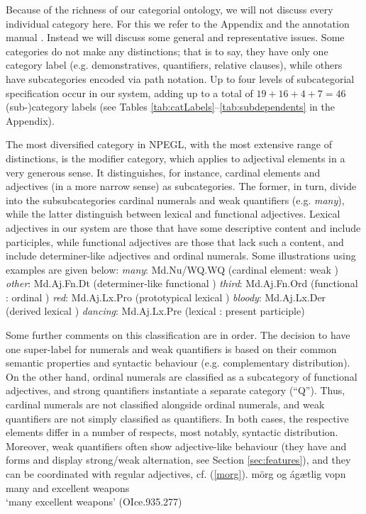 \documentclass[output=paper,colorlinks,citecolor=brown]{langscibook}
\begin{document}
Because of the richness of our categorial ontology, we will not discuss every individual category here. For this we refer to the Appendix  and the annotation manual \citep{Pfaff2019Annot}. Instead we will discuss some general and representative issues. Some categories do not make any distinctions; that is to say, they have only one category label (e.g. demonstratives, quantifiers, relative clauses), while others have subcategories encoded via path notation. Up to four levels of subcategorial specification occur in our system, adding up to a total of  $19 + 16 + 4 + 7 = 46$ (sub-)category labels (see Tables \ref{tab:catLabels}--\ref{tab:subdependents} in the Appendix). 

The most diversified category in NPEGL, with the most extensive range of distinctions, is the modifier category, which applies to adjectival elements in a very generous sense. It distinguishes, for instance, cardinal elements and adjectives (in a more narrow sense) as subcategories. The former, in turn, divide into the subsubcategories cardinal numerals and weak quantifiers (e.g. \textit{many}), while the latter distinguish between lexical and functional adjectives. Lexical adjectives in our system are those that have some descriptive content and include participles, while functional adjectives are those that lack such a content, and include determiner-like adjectives and ordinal numerals. Some illustrations using  examples are given below:
\ea
    \ea \textit{many}: Md.Nu/WQ.WQ \hfill (cardinal element: weak )
    \ex \textit{other}: Md.Aj.Fn.Dt   \hfill (determiner-like functional )
    \ex \textit{third}: Md.Aj.Fn.Ord   \hfill (functional : ordinal )
    \ex \textit{red}: Md.Aj.Lx.Pro  \hfill (prototypical lexical )
    \ex \textit{bloody}: Md.Aj.Lx.Der  \hfill (derived lexical )
    \ex \textit{dancing}: Md.Aj.Lx.Pre \hfill (lexical : present participle)
    \z
\z

Some further comments on this classification are in order.    
The decision to have one super-label for numerals and weak quantifiers is based on their common semantic properties and syntactic behaviour (e.g. complementary distribution). On the other hand, ordinal numerals are classified as a subcategory of functional adjectives, and strong quantifiers instantiate a separate category (``Q''). Thus,  cardinal numerals are not classified alongside ordinal numerals, and weak quantifiers are not simply classified as quantifiers. In both cases, the respective elements differ in a number of respects, most notably, syntactic distribution. Moreover, weak quantifiers often show adjective-like behaviour (they have  and  forms and  display strong/weak alternation, see Section \ref{sec:features}), and they can be coordinated with regular adjectives, cf. (\ref{morg}).
\ea \label{morg}
\gll mörg og  ágætlig   vopn  \\  
         many   and excellent weapons\\
    \glt `many excellent weapons' 
    (OIce.935.277)
\z 
\end{document}
